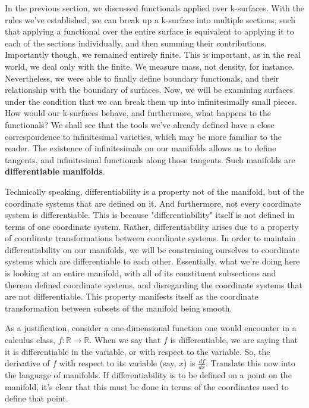 \documentclass{book}
\begin{document}
In the previous section, we discussed functionals applied over k-surfaces. With the rules we've established, we can break up a k-surface into multiple sections, such that applying a functional over the entire surface is equivalent to applying it to each of the sections individually, and then summing their contributions. Importantly though, we remained entirely finite. This is important, as in the real world, we deal only with the finite. We measure mass, not density, for instance. Nevertheless, we were able to finally define boundary functionals, and their relationship with the boundary of surfaces. Now, we will be examining surfaces under the condition that we can break them up into infinitesimally small pieces. How would our k-surfaces behave, and furthermore, what happens to the functionals? We shall see that the tools we've already defined have a close correspondence to infinitesimal varieties, which may be more familiar to the reader. The existence of infinitesimals on our manifolds allows us to define tangents, and infinitesimal functionals along those tangents. Such manifolds are \textbf{differentiable manifolds}. 

Technically speaking, differentiability is a property not of the manifold, but of the coordinate systems that are defined on it. And furthermore, not every coordinate system is differentiable. This is because "differentiability" itself is not defined in terms of one coordinate system. Rather, differentiability arises due to a property of coordinate transformations between coordinate systems. In order to maintain differentiability on our manifolds, we will be constraining ourselves to coordinate systems which are differentiable to each other. Essentially, what we're doing here is looking at an entire manifold, with all of its constituent subsections and thereon defined coordinate systems, and disregarding the coordinate systems that are not differentiable. This property manifests itself as the coordinate transformation between subsets of the manifold being smooth. 

As a justification, consider a one-dimensional function one would encounter in a calculus class, $f: \mathbb{R} \to \mathbb{R}$. When we say that $f$ is differentiable, we are saying that it is differentiable in the variable, or with respect to the variable. So, the derivative of $f$ with respect to its variable (say, $x$) is $\frac{df}{dx}$. Translate this now into the language of manifolds. If differentiability is to be defined on a point on the manifold, it's clear that this must be done in terms of the coordinates used to define that point. 
\end{document}
